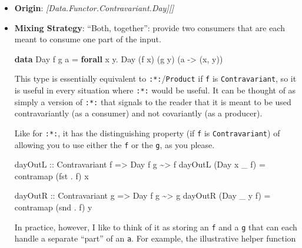 \documentclass[]{article}
\newenvironment{Shaded}{}{}
\newcommand{\DataTypeTok}[1]{\textcolor[rgb]{0.56,0.13,0.00}{#1}}
\newcommand{\FunctionTok}[1]{\textcolor[rgb]{0.02,0.16,0.49}{#1}}
\newcommand{\KeywordTok}[1]{\textcolor[rgb]{0.00,0.44,0.13}{\textbf{#1}}}
\newcommand{\NormalTok}[1]{#1}
\newcommand{\OperatorTok}[1]{\textcolor[rgb]{0.40,0.40,0.40}{#1}}
\newcommand{\OtherTok}[1]{\textcolor[rgb]{0.00,0.44,0.13}{#1}}
\begin{document}
\begin{itemize}
\item
  \textbf{Origin}: \emph{{[}Data.Functor.Contravariant.Day{]}{[}{]}}
\item
  \textbf{Mixing Strategy}: ``Both, together'': provide two consumers that are
  each meant to consume one part of the input.

\begin{Shaded}
\begin{Highlighting}[]
\KeywordTok{data} \DataTypeTok{Day}\NormalTok{ f g a }\OtherTok{=} \KeywordTok{forall}\NormalTok{ x y}\OperatorTok{.} \DataTypeTok{Day}\NormalTok{ (f x) (g y) (a }\OtherTok{{-}>}\NormalTok{ (x, y))}
\end{Highlighting}
\end{Shaded}

  This type is essentially equivalent to \texttt{:*:}/\texttt{Product} if
  \texttt{f} is \texttt{Contravariant}, so it is useful in every situation where
  \texttt{:*:} would be useful. It can be thought of as simply a version of
  \texttt{:*:} that signals to the reader that it is meant to be used
  contravariantly (as a consumer) and not covariantly (as a producer).

  Like for \texttt{:*:}, it has the distinguishing property (if \texttt{f} is
  \texttt{Contravariant}) of allowing you to use either the \texttt{f} or the
  \texttt{g}, as you please.

\begin{Shaded}
\begin{Highlighting}[]
\OtherTok{dayOutL ::} \DataTypeTok{Contravariant}\NormalTok{ f }\OtherTok{=>} \DataTypeTok{Day}\NormalTok{ f g }\OperatorTok{\textasciitilde{}>}\NormalTok{ f}
\NormalTok{dayOutL (}\DataTypeTok{Day}\NormalTok{ x \_ f) }\OtherTok{=}\NormalTok{ contramap (}\FunctionTok{fst} \OperatorTok{.}\NormalTok{ f) x}

\OtherTok{dayOutR ::} \DataTypeTok{Contravariant}\NormalTok{ g }\OtherTok{=>} \DataTypeTok{Day}\NormalTok{ f g }\OperatorTok{\textasciitilde{}>}\NormalTok{ g}
\NormalTok{dayOutR (}\DataTypeTok{Day}\NormalTok{ \_ y f) }\OtherTok{=}\NormalTok{ contramap (}\FunctionTok{snd} \OperatorTok{.}\NormalTok{ f) y}
\end{Highlighting}
\end{Shaded}

  In practice, however, I like to think of it as storing an \texttt{f} and a
  \texttt{g} that can each handle a separate ``part'' of an \texttt{a}. For
  example, the illustrative helper function


\end{itemize}
\end{document}
